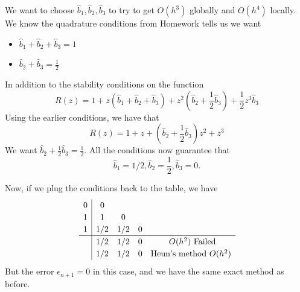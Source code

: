 \documentclass{article}
\begin{document}
We want to choose $\hat{b}_1, \hat{b}_2, \hat{b}_3$ to try to get $O(h^3)$ globally and $O(h^4)$ locally. We know the quadrature conditions from Homework tells us we want
\begin{itemize}
    \item $\hat{b}_1 + \hat{b}_2 + \hat{b}_3 = 1$
    \item $\hat{b}_2 + \hat{b}_3 = \frac{1}{2}$
\end{itemize}
In addition to the stability conditions on the function
\[R(z) = 1 + z(\hat{b}_1 + \hat{b}_2 + \hat{b}_3) + z^2 (\hat{b}_2 + \frac{1}{2}\hat{b}_3) + \frac{1}{2} z^3 \hat{b}_3\]
Using the earlier conditions, we have that
\[R(z) = 1 + z  + (\hat{b}_2 + \frac{1}{2} \hat{b}_3 ) z^2 + z^3\]
We want $\hat{b}_2 + \frac{1}{2} \hat{b}_3 = \frac{1}{2}$. All the conditions now guarantee that
\[\hat{b}_1 = 1/2, \hat{b}_2 = \frac{1}{2}, \hat{b}_3 = 0.\]

Now, if we plug the conditions back to the table, we have
    \[
\renewcommand\arraystretch{1.2}
\begin{array}
{c|cccc}
0 & 0\\
1 & 1 & 0\\
1 & 1/2 & 1/2 & 0\\
\hline
& 1/2 & 1/2 & 0 & \text{ $O(h^2)$ Failed}\\
& 1/2 & 1/2 & 0 & \text{Heun's method $O(h^2)$}
\end{array}
\]
But the error $\epsilon_{n+1} = 0$ in this case, and we have the same exact method as before.\\
\end{document}
